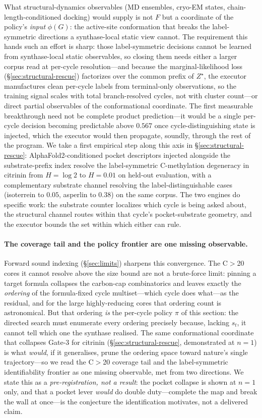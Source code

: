 \documentclass[11pt]{article}
\theoremstyle{definition}
\newcommand{\zstar}{\ensuremath{Z^{\star}}}
\begin{document}
What structural-dynamics observables (MD ensembles, cryo-EM states, chain-length-conditioned
docking) would supply is not $F$ but a coordinate of the policy's \emph{input} $\phi(G)$: the active-site
conformation that breaks the label-symmetric directions a synthase-local static view cannot. The requirement
this hands such an effort is sharp: those label-symmetric decisions cannot be learned from
synthase-local static observables, so closing them needs either a larger corpus read at per-cycle
resolution---and because the marginal-likelihood loss (\S\ref{sec:structural-rescue}) factorizes over the
common prefix of \zstar{}, the executor manufactures clean per-cycle labels from terminal-only
observations, so the training signal scales with total branch-resolved cycles, not with cluster
count---or direct partial observables of the conformational coordinate. The first measurable
breakthrough need not be complete product prediction---it would be a single per-cycle decision becoming
predictable above $0.567$ once cycle-distinguishing state is injected, which the executor would then
propagate, soundly, through the rest of the program. We take a first empirical step along this axis
in \S\ref{sec:structural-rescue}: AlphaFold2-conditioned pocket descriptors injected alongside the
substrate-prefix index resolve the label-symmetric C-methylation degeneracy in citrinin from
$H=\log 2$ to $H=0.01$ on held-out evaluation, with a complementary substrate channel resolving the
label-distinguishable cases (isoterrein to $0.05$, asperlin to $0.38$) on the same corpus. The two engines do
specific work: the substrate counter localizes which cycle is being asked about, the structural
channel routes within that cycle's pocket-substrate geometry, and the executor bounds the set
within which either can rule.

\paragraph{The coverage tail and the policy frontier are one missing observable.} Forward sound indexing
(\S\ref{sec:limits}) sharpens this convergence. The C$>$20 cores it cannot resolve above the size bound are
not a brute-force limit: pinning a target formula collapses the carbon-cap combinatorics and leaves exactly
the \emph{ordering} of the formula-fixed cycle multiset---which cycle does what---as the residual, and for
the large highly-reducing cores that ordering count is astronomical. But that ordering \emph{is} the
per-cycle policy $\pi$ of this section: the directed search must enumerate every ordering precisely because,
lacking $s_t$, it cannot tell which one the synthase realised. The same conformational coordinate that collapses
Gate-3 for citrinin (\S\ref{sec:structural-rescue}, demonstrated at $n{=}1$) is what \emph{would}, if it
generalises, prune the ordering space toward nature's single trajectory---so we read the C$>$20 coverage
tail and the label-symmetric identifiability frontier as one missing observable, met from two directions.
We state this as a \emph{pre-registration, not a result}: the pocket collapse is shown at $n{=}1$ only, and
that a pocket lever \emph{would} do double duty---complete the map and break the wall at once---is the
conjecture the identification motivates, not a delivered claim.
\end{document}
